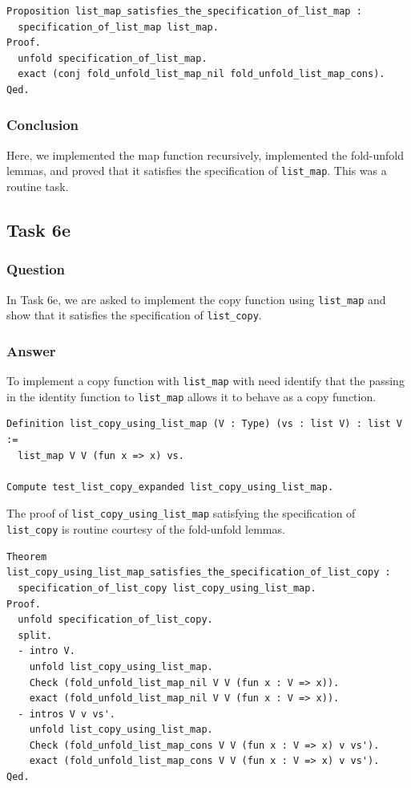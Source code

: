 \documentclass{article}
\begin{document}
\begin{lstlisting}
Proposition list_map_satisfies_the_specification_of_list_map :
  specification_of_list_map list_map.
Proof.
  unfold specification_of_list_map.
  exact (conj fold_unfold_list_map_nil fold_unfold_list_map_cons).
Qed.
\end{lstlisting}

\subsubsection{Conclusion}

Here, we implemented the map function recursively, implemented the fold-unfold lemmas, and proved that it satisfies the specification of \texttt{list\_map}. This was a routine task.

\subsection{Task 6e}

\subsubsection{Question}
In Task 6e, we are asked to implement the copy function using \texttt{list\_map} and show that it satisfies the specification of \texttt{list\_copy}.

\subsubsection{Answer}
To implement a copy function with \texttt{list\_map} with need identify that the passing in the identity function to \texttt{list\_map} allows it to behave as a copy function.

\begin{lstlisting}
Definition list_copy_using_list_map (V : Type) (vs : list V) : list V :=
  list_map V V (fun x => x) vs. 

Compute test_list_copy_expanded list_copy_using_list_map.
\end{lstlisting}

The proof of \texttt{list\_copy\_using\_list\_map} satisfying the specification of \texttt{list\_copy} is routine courtesy of the fold-unfold lemmas.

\begin{lstlisting}
Theorem list_copy_using_list_map_satisfies_the_specification_of_list_copy :
  specification_of_list_copy list_copy_using_list_map.
Proof.
  unfold specification_of_list_copy.
  split.
  - intro V. 
    unfold list_copy_using_list_map.
    Check (fold_unfold_list_map_nil V V (fun x : V => x)).
    exact (fold_unfold_list_map_nil V V (fun x : V => x)).
  - intros V v vs'.
    unfold list_copy_using_list_map. 
    Check (fold_unfold_list_map_cons V V (fun x : V => x) v vs').
    exact (fold_unfold_list_map_cons V V (fun x : V => x) v vs').
Qed.
\end{lstlisting}
\end{document}
